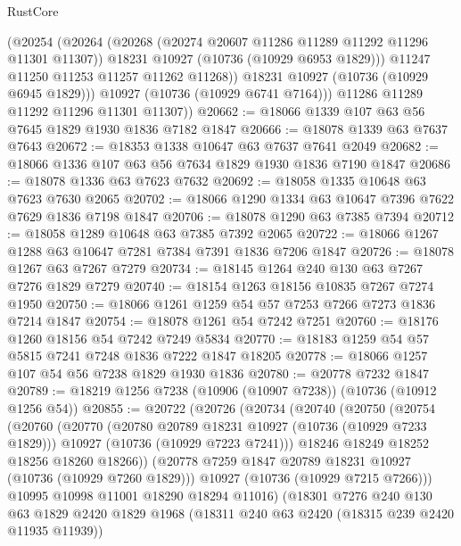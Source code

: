 \begin{lexlean}{RustCore}
\begin{coremodule}
              (@20254
                (@20264
                  (@20268 (@20274 @20607 @11286 @11289 @11292 @11296 @11301 @11307))
                  @18231
                  @10927
                  (@10736 (@10929 @6953 @1829)))
                @11247
                @11250
                @11253
                @11257
                @11262
                @11268))
            @18231
            @10927
            (@10736 (@10929 @6945 @1829)))
          @10927
          (@10736 (@10929 @6741 @7164)))
        @11286
        @11289
        @11292
        @11296
        @11301
        @11307))
@20662 := @18066 @1339 @107 @63 @56 @7645 @1829 @1930 @1836 @7182 @1847
@20666 := @18078 @1339 @63 @7637 @7643
@20672 := @18353 @1338 @10647 @63 @7637 @7641 @2049
@20682 := @18066 @1336 @107 @63 @56 @7634 @1829 @1930 @1836 @7190 @1847
@20686 := @18078 @1336 @63 @7623 @7632
@20692 := @18058 @1335 @10648 @63 @7623 @7630 @2065
@20702 := @18066 @1290 @1334 @63 @10647 @7396 @7622 @7629 @1836 @7198 @1847
@20706 := @18078 @1290 @63 @7385 @7394
@20712 := @18058 @1289 @10648 @63 @7385 @7392 @2065
@20722 := @18066 @1267 @1288 @63 @10647 @7281 @7384 @7391 @1836 @7206 @1847
@20726 := @18078 @1267 @63 @7267 @7279
@20734 := @18145 @1264 @240 @130 @63 @7267 @7276 @1829 @7279
@20740 := @18154 @1263 @18156 @10835 @7267 @7274 @1950
@20750 := @18066 @1261 @1259 @54 @57 @7253 @7266 @7273 @1836 @7214 @1847
@20754 := @18078 @1261 @54 @7242 @7251
@20760 := @18176 @1260 @18156 @54 @7242 @7249 @5834
@20770 := @18183 @1259 @54 @57 @5815 @7241 @7248 @1836 @7222 @1847 @18205
@20778 := @18066 @1257 @107 @54 @56 @7238 @1829 @1930 @1836
@20780 := @20778 @7232 @1847
@20789 := @18219 @1256 @7238 (@10906 (@10907 @7238)) (@10736 (@10912 @1256 @54))
@20855 := @20722
    (@20726
      (@20734
        (@20740
          (@20750
            (@20754
              (@20760
                (@20770
                  (@20780 @20789 @18231 @10927 (@10736 (@10929 @7233 @1829)))
                  @10927
                  (@10736 (@10929 @7223 @7241)))
                @18246
                @18249
                @18252
                @18256
                @18260
                @18266))
            (@20778 @7259 @1847 @20789 @18231 @10927 (@10736 (@10929 @7260 @1829)))
            @10927
            (@10736 (@10929 @7215 @7266)))
          @10995
          @10998
          @11001
          @18290
          @18294
          @11016)
        (@18301
          @7276
          @240
          @130
          @63
          @1829
          @2420
          @1829
          @1968
          (@18311 @240 @63 @2420 (@18315 @239 @2420 @11935 @11939))

\end{coremodule}
\end{lexlean}

